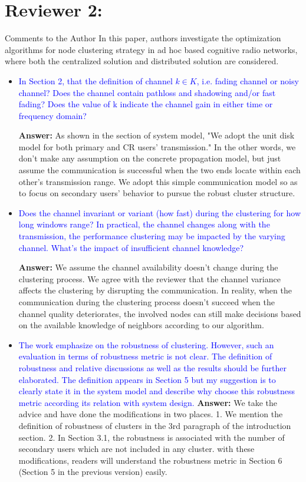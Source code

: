\documentclass[10pt,a4paper]{article}
\begin{document}
\section{Reviewer 2:}

Comments to the Author
In this paper, authors investigate the optimization algorithms for node clustering strategy in ad hoc based cognitive radio networks, where both the centralized solution and distributed solution are considered.
\begin{itemize}


\item \textcolor{blue}{ In Section 2, that the definition of channel $k\in K$, i.e. fading channel or noisy channel? Does the channel contain pathloss and shadowing and/or fast fading? Does the value of k indicate the channel gain in either time or frequency domain? }

\textbf{Answer:} As shown in the section of system model, "We adopt the unit disk model for both primary and CR users’ transmission."
In the other words, we don't make any assumption on the concrete propagation model, but just assume the communication is successful when the two ends locate within each other's transmission range.
We adopt this simple communication model so as to focus on secondary users' behavior to pursue the robust cluster structure.

\item \textcolor{blue}{ Does the channel invariant or variant (how fast) during the clustering for how long windows range? In practical, the channel changes along with the transmission, the performance clustering may be impacted by the varying channel. What's the impact of insufficient channel knowledge?}

\textbf{Answer:} We assume the channel availability doesn't change during the clustering process.
We agree with the reviewer that the channel variance affects the clustering by disrupting the communication.
In reality, when the communication during the clustering process doesn't succeed when the channel quality deteriorates, the involved nodes can still make decisions based on the available knowledge of neighbors according to our algorithm.


\item \textcolor{blue}{ The work emphasize on the robustness of clustering. However, such an evaluation in terms of robustness metric is not clear. The definition of robustness and relative discussions as well as the results should be further elaborated. The definition appears in Section 5 but my suggestion is to clearly state it in the system model and describe why choose this robustness metric according its relation with system design.}
\textbf{Answer:} We take the advice and have done the modifications in two places.
1. We mention the definition of robustness of clusters in the 3rd paragraph of the introduction section.
2. In Section 3.1, the robustness is associated with the number of secondary users which are not included in any cluster.
with these modifications, readers will understand the robustness metric in Section 6 (Section 5 in the previous version) easily. 



\end{itemize}
\end{document}
